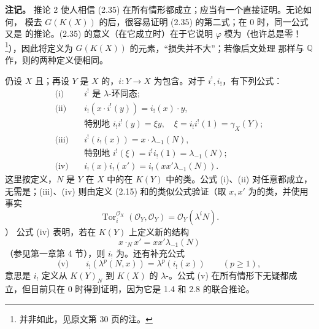\textbf{注记。} 推论 2 使人相信 (2.35) 在所有情形都成立；应当有一个直接证明。无论如何，
模去 $G(K(X))$ 的后，很容易证明 (2.35) 的第二式；在 $0$ 时，同一公式又是 的推论。(2.35) 的意义（在它成立时）在于它说明 $\varphi$ 模为（也许总是零！\footnote{并非如此，见原文第 30 页的注。}），因此将定义为 $G(K(X))$ 的元素，“损失并不大”；若像后文处理 那样与 $\mathbb Q$ 作，则的两种定义便相同。

仍设 $X$ 且；再设 $Y$ 是 $X$ 的，$i:Y\to X$ 为包含。对于 $i^!,i_!$，有下列公式：
\[
\begin{aligned}
\text{(i)}\quad &i^!\text{ 是 }\lambda\text{-环同态};\\
\text{(ii)}\quad &i_!(x\cdot i^!(y))=i_!(x)\cdot y,\\
&\text{特别地 }i_!i^!(y)=\xi y,\quad \xi=i_!i^!(1)=\gamma_X(Y);\\
\text{(iii)}\quad&i^!(i_!(x))=x\cdot\lambda_{-1}(N),\\
&\text{特别地 }i^!(\xi)=i^!i_!(1)=\lambda_{-1}(N);\\
\text{(iv)}\quad&i_!(x)i_!(x')=i_!(xx'\lambda_{-1}(N)).
\end{aligned}
\]
这里按定义，$N$ 是 $Y$ 在 $X$ 中的在 $K(Y)$ 中的类。公式 (i)、(ii) 对任意都成立，无需是；(iii)、(iv) 则由定义 (2.15) 和的类似公式验证（取 $x,x'$ 为的类，并使用事实
\[
\operatorname{Tor}^{\mathcal O_X}_i(\mathcal O_Y,\mathcal O_Y)=\mathcal O_Y(\lambda^iN).\tag{2.36}
\]
）
公式 (iv) 表明，若在 $K(Y)$ 上定义新的结构
\[
x\mathbin{\cdot_N}x'=xx'\lambda_{-1}(N)
\]
（参见第一章第 4 节），则 $i_!$ 为。还有补充公式
\[
\text{(v)}\qquad i_!(\lambda^p(N,x))=\lambda^p(i_!(x))\qquad(p\geq1),
\]
意思是 $i_!$ 定义从 $K(Y)_N$ 到 $K(X)$ 的 $\lambda$-。公式 (v) 在所有情形下无疑都成立，但目前只在 $0$ 时得到证明，因为它是 1.4 和 2.8 的联合推论。

